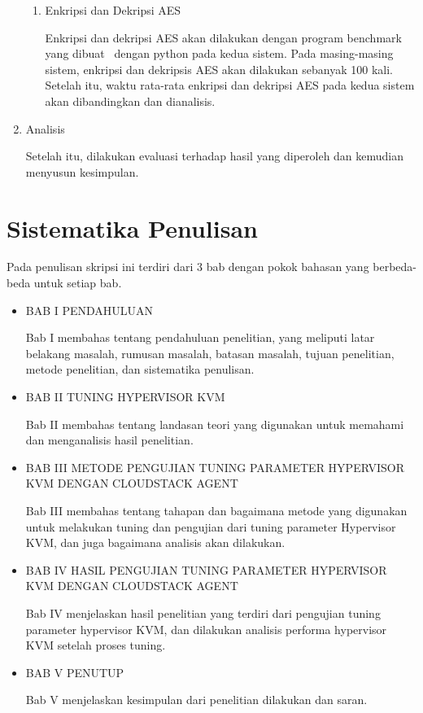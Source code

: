 \begin{enumerate}
\begin{enumerate}
                  \item Enkripsi dan Dekripsi AES

                        Enkripsi dan dekripsi AES akan dilakukan dengan program benchmark yang dibuat \saya\ dengan python pada kedua sistem. Pada masing-masing sistem, enkripsi dan dekripsis AES akan dilakukan sebanyak 100 kali. Setelah itu, waktu rata-rata enkripsi dan dekripsi AES pada kedua sistem akan dibandingkan dan dianalisis.
            \end{enumerate}

      \item Analisis

            Setelah itu, dilakukan evaluasi terhadap hasil yang diperoleh dan kemudian menyusun kesimpulan.
\end{enumerate}


\section{Sistematika Penulisan}
Pada penulisan skripsi ini terdiri dari 3 bab dengan pokok bahasan yang berbeda-beda untuk setiap bab.
\begin{itemize}
      \item BAB I PENDAHULUAN

            Bab I membahas tentang pendahuluan penelitian, yang meliputi latar belakang masalah, rumusan masalah, batasan masalah, tujuan penelitian, metode penelitian, dan sistematika penulisan.

      \item BAB II TUNING HYPERVISOR KVM

            Bab II membahas tentang landasan teori yang digunakan untuk memahami dan menganalisis hasil penelitian.

      \item BAB III METODE PENGUJIAN TUNING PARAMETER HYPERVISOR KVM DENGAN CLOUDSTACK AGENT

            Bab III membahas tentang tahapan dan bagaimana metode yang digunakan untuk melakukan tuning dan pengujian dari tuning parameter Hypervisor KVM, dan juga bagaimana analisis akan dilakukan.

      \item BAB IV HASIL PENGUJIAN TUNING PARAMETER HYPERVISOR KVM DENGAN CLOUDSTACK AGENT

            Bab IV menjelaskan hasil penelitian yang terdiri dari pengujian tuning parameter hypervisor KVM, dan dilakukan analisis performa hypervisor KVM setelah proses tuning.

      \item BAB V PENUTUP

            Bab V menjelaskan kesimpulan dari penelitian dilakukan dan saran.
\end{itemize}